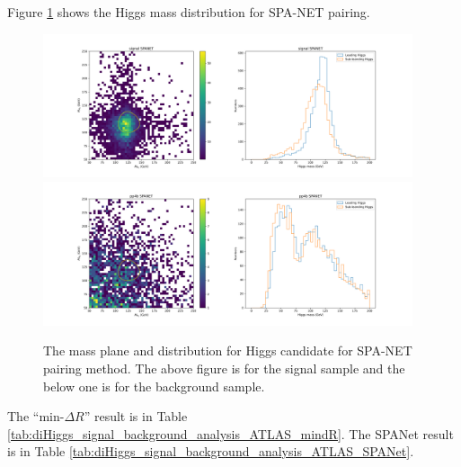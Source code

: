 \documentclass[12pt]{article}
\begin{document}
		Figure \ref{fig:Higgs_mass_new_SPANET} shows the Higgs mass distribution for SPA-NET pairing.
		\begin{figure}[htpb]
			\centering
			\includegraphics[width=0.97\textwidth]{Higgs_mass_new_SPANET_s.png}
			\includegraphics[width=0.97\textwidth]{Higgs_mass_new_SPANET_4b.png}
			\caption{The mass plane and distribution for Higgs candidate for SPA-NET pairing method. The above figure is for the signal sample and the below one is for the background sample.}
			\label{fig:Higgs_mass_new_SPANET}
		\end{figure}

		The ``$\text{min-}\Delta R$'' result is in Table \ref{tab:diHiggs_signal_background_analysis_ATLAS_mindR}. The SPANet result is in Table \ref{tab:diHiggs_signal_background_analysis_ATLAS_SPANet}.
\end{document}
